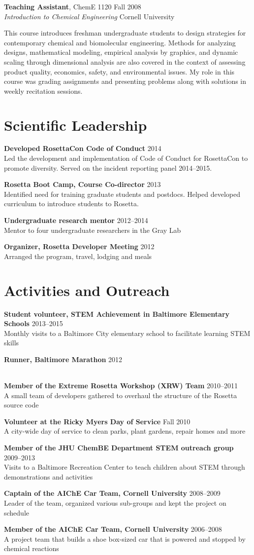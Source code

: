 \documentclass[12pt]{article}
\newcommand{\allcapsspacing}[1]{{\addfontfeature{LetterSpace=7.5}#1}}
\newcommand{\tworowstwocolsitem}[4]{
{#1} \hfill {#2} \\
{#3} \hfill {#4} \\
\vspace{-0.5\baselineskip}\par}
\newcommand{\teachingitem}[4]{
\tworowstwocolsitem{#1}{#2}{\textit{#3}}{#4}}
\newcommand{\leadershipitem}[3]{
\textbf{#1} \hfill {#2} \\
#3 \\
\vspace{-0.5\baselineskip}\par}
\begin{document}
\teachingitem{\textbf{Teaching Assistant}, ChemE 1120}{Fall 2008}{Introduction to Chemical Engineering}{Cornell University}
This course introduces freshman undergraduate students to design strategies for contemporary chemical and biomolecular engineering.
Methods for analyzing designs, mathematical modeling, empirical analysis by graphics, and dynamic scaling through dimensional analysis are also covered in the context of assessing product quality, economics, safety, and environmental issues.
My role in this course was grading assignments and presenting problems along with solutions in weekly recitation sessions.\par\vspace{\baselineskip}

\section*{\allcapsspacing{Scientific Leadership}}
\leadershipitem{Developed RosettaCon Code of Conduct}{2014}{Led the development and implementation of Code of Conduct for RosettaCon to promote diversity. Served on the incident reporting panel 2014--2015.}
\leadershipitem{Rosetta Boot Camp, Course Co-director}{2013}{Identified need for training graduate students and postdocs. Helped developed curriculum to introduce students to Rosetta.}
\leadershipitem{Undergraduate research mentor}{2012--2014}{Mentor to four undergraduate researchers in the Gray Lab}
\leadershipitem{Organizer, Rosetta Developer Meeting}{2012}{Arranged the program, travel, lodging and meals}

\section*{\allcapsspacing{Activities and Outreach}}
\leadershipitem{Student volunteer, STEM Achievement in Baltimore Elementary Schools}{2013--2015}{Monthly visits to a Baltimore City elementary school to facilitate learning STEM skills}
\leadershipitem{Runner, Baltimore Marathon}{2012}{\vspace{-\baselineskip}}
\leadershipitem{Member of the Extreme Rosetta Workshop (XRW) Team}{2010--2011}{A small team of developers gathered to overhaul the structure of the Rosetta source code}
\leadershipitem{Volunteer at the Ricky Myers Day of Service}{Fall 2010}{A city-wide day of service to clean parks, plant gardens, repair homes and more}
\leadershipitem{Member of the JHU ChemBE Department STEM outreach group}{2009--2013}{Visits to a Baltimore Recreation Center to teach children about STEM through demonstrations and activities}
\leadershipitem{Captain of the AIChE Car Team, Cornell University}{2008--2009}{Leader of the team, organized various sub-groups and kept the project on schedule}
\leadershipitem{Member of the AIChE Car Team, Cornell University}{2006--2008}{A project team that builds a shoe box-sized car that is powered and stopped by chemical reactions}
\end{document}

